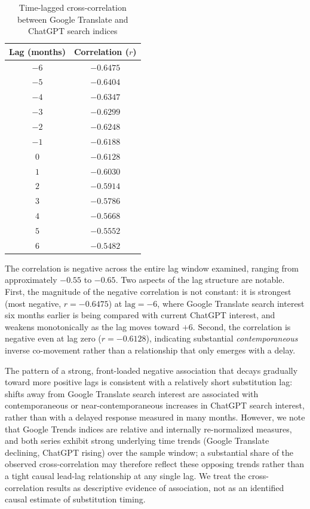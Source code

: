 \documentclass[11pt]{article}
\begin{document}
\begin{table}[htbp]
\centering
\caption{Time-lagged cross-correlation between Google Translate and ChatGPT search indices}
\label{tab:crosscorr}
\begin{tabular}{cc}
\toprule
Lag (months) & Correlation ($r$) \\
\midrule
$-6$ & $-0.6475$ \\
$-5$ & $-0.6404$ \\
$-4$ & $-0.6347$ \\
$-3$ & $-0.6299$ \\
$-2$ & $-0.6248$ \\
$-1$ & $-0.6188$ \\
$0$  & $-0.6128$ \\
$1$  & $-0.6030$ \\
$2$  & $-0.5914$ \\
$3$  & $-0.5786$ \\
$4$  & $-0.5668$ \\
$5$  & $-0.5552$ \\
$6$  & $-0.5482$ \\
\bottomrule
\end{tabular}
\end{table}

The correlation is negative across the entire lag window examined, ranging from approximately $-0.55$ to $-0.65$. Two aspects of the lag structure are notable. First, the magnitude of the negative correlation is not constant: it is strongest (most negative, $r=-0.6475$) at $\text{lag}=-6$, where Google Translate search interest six months earlier is being compared with current ChatGPT interest, and weakens monotonically as the lag moves toward $+6$. Second, the correlation is negative even at lag zero ($r=-0.6128$), indicating substantial \emph{contemporaneous} inverse co-movement rather than a relationship that only emerges with a delay.

The pattern of a strong, front-loaded negative association that decays gradually toward more positive lags is consistent with a relatively short substitution lag: shifts away from Google Translate search interest are associated with contemporaneous or near-contemporaneous increases in ChatGPT search interest, rather than with a delayed response measured in many months. However, we note that Google Trends indices are relative and internally re-normalized measures, and both series exhibit strong underlying time trends (Google Translate declining, ChatGPT rising) over the sample window; a substantial share of the observed cross-correlation may therefore reflect these opposing trends rather than a tight causal lead-lag relationship at any single lag. We treat the cross-correlation results as descriptive evidence of association, not as an identified causal estimate of substitution timing.
\end{document}
